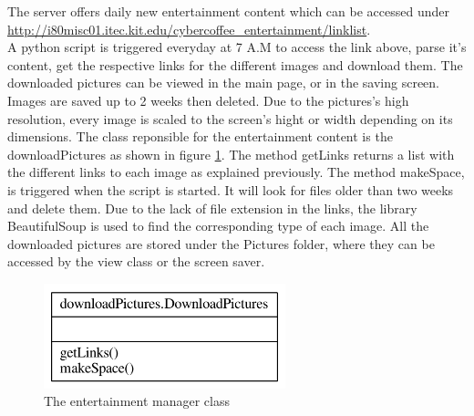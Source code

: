 \documentclass[12pt]{article}
\begin{document}
   The server offers daily new entertainment content which can be accessed under \url{http://i80misc01.itec.kit.edu/cybercoffee_entertainment/linklist}.\\
   A python script is triggered everyday at 7 A.M to access the link above, parse it's content, get the respective links for the different images and download them. 
   The downloaded pictures can be viewed in the main page, or in the saving screen. Images are saved up to 2 weeks then deleted.
   Due to the pictures's high resolution, every image is scaled to the screen's hight or width depending on its dimensions.
   The class reponsible for the entertainment content is the downloadPictures as shown in figure \ref{fig:downloadPictures}. 
   The method getLinks returns a list with the different links to each image as explained previously. The method makeSpace, is triggered when the script is started. 
   It will look for files older than two weeks and delete them.
   Due to the lack of file extension in the links, the library BeautifulSoup is used to find the corresponding type of each image.
   All the downloaded pictures are stored under the Pictures folder, where they can be accessed by the view class or the screen saver.\\
   \begin{figure}[H]
   \centering
   \includegraphics[width=7cm]{./images/entertainmentClasses}
   \captionsetup{justification=centering}
   \caption{The entertainment manager class}
   \label{fig:downloadPictures}
  \end{figure}
    
\end{document}
